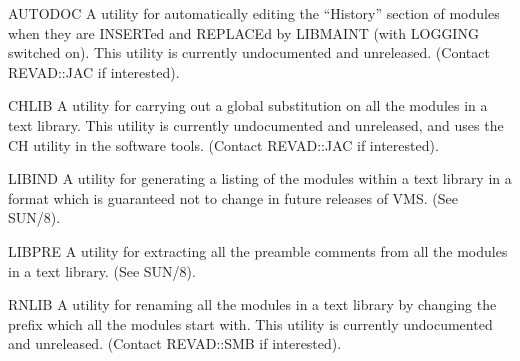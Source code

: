\begin{list}{}{\setlength{\labelwidth}{\numlen}\setlength{\leftmargin}{\numlen}
\addtolength{\leftmargin}{\labelsep}}

\item[AUTODOC] A utility for automatically editing the ``History'' section
of modules when they are INSERTed and REPLACEd by LIBMAINT (with
LOGGING switched on).
This utility is currently undocumented and unreleased.
(Contact REVAD::JAC if interested).

\item[CHLIB] A utility for carrying out a global substitution on all the
modules in a text library.
This utility is currently undocumented and unreleased, and uses the CH
utility in the software tools.
(Contact REVAD::JAC if interested).

\item[LIBIND] A utility for generating a listing of the modules
within a text library in a format which is guaranteed not
to change in future releases of VMS.
(See SUN/8).

\item[LIBPRE] A utility for extracting all the preamble comments from
all the modules in a text library.
(See SUN/8).

\item[RNLIB] A utility for renaming all the modules in a text library
by changing the prefix which all the modules start with.
This utility is currently undocumented and unreleased.
(Contact REVAD::SMB if interested).

\end{list}


